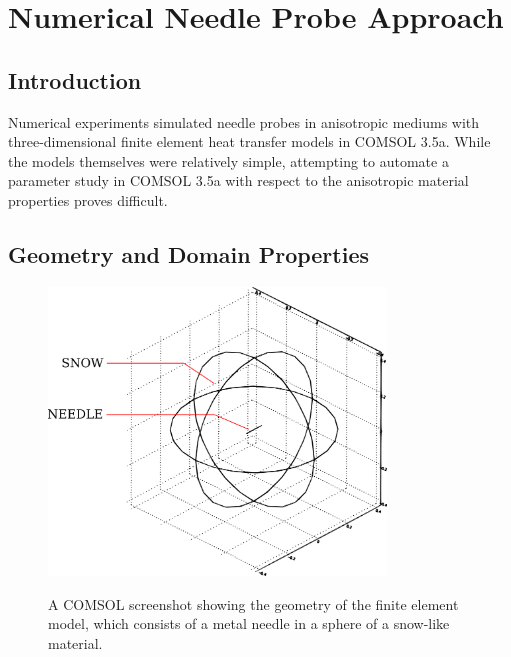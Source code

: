 \chapter{Numerical Needle Probe Approach}
\label{sec:numerical-np}
\bigskip

\section{Introduction} 
\label{sec:numerical-np:introduction}

Numerical experiments simulated needle probes in anisotropic mediums with
three-dimensional finite element heat transfer models in COMSOL 3.5a. While the
models themselves were relatively simple, attempting to automate a parameter
study in COMSOL 3.5a with respect to the anisotropic material properties proves
difficult.

\section{Geometry and Domain Properties}
\label{sec:numerical-np:domain}


\begin{figure}[h]
\centering
\includegraphics[width=0.8\textwidth]{fig/domain.png}
\label{fig:domain}
\caption{A COMSOL screenshot showing the geometry of the finite element model, which consists of a metal needle in a sphere of a snow-like material.}
\end{figure}


